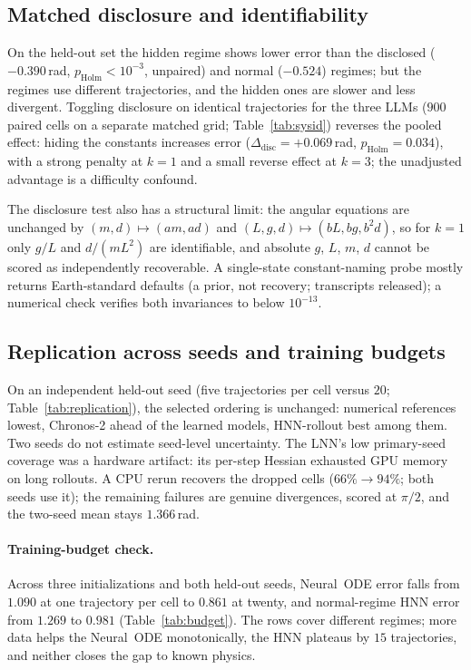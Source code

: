 \documentclass{article}
\begin{document}
\subsection{Matched disclosure and identifiability}
\label{sec:sysid}
On the held-out set the hidden regime shows lower error than the disclosed ($-0.390$\,rad,
$p_{\mathrm{Holm}}{<}10^{-3}$, unpaired) and normal ($-0.524$) regimes; but the regimes use
different trajectories, and the hidden ones are slower and less divergent. Toggling
disclosure on identical trajectories for the three LLMs ($900$ paired cells on a separate
matched grid; Table~\ref{tab:sysid}) reverses the pooled effect: hiding the constants
increases error ($\Delta_{\mathrm{disc}}{=}{+}0.069$\,rad, $p_{\mathrm{Holm}}{=}0.034$),
with a strong penalty at $k{=}1$ and a small reverse effect at $k{=}3$; the unadjusted
advantage is a difficulty
confound.

The disclosure test also has a structural limit: the angular equations are unchanged by
$(m,d)\mapsto(am,ad)$ and $(L,g,d)\mapsto(bL,bg,b^2d)$, so for $k{=}1$ only $g/L$ and
$d/(mL^2)$ are identifiable, and absolute $g$, $L$, $m$, $d$ cannot
be scored as independently recoverable. A single-state constant-naming probe mostly returns
Earth-standard defaults (a prior, not recovery; transcripts released); a numerical check verifies both invariances
to below $10^{-13}$.

\subsection{Replication across seeds and training budgets}
\label{sec:replication}
On an independent held-out seed (five trajectories per cell versus $20$;
Table~\ref{tab:replication}), the selected ordering is unchanged: numerical references
lowest, Chronos-2 ahead of the learned models, HNN-rollout best among them. Two seeds do not
estimate seed-level uncertainty. The LNN's low primary-seed coverage was a hardware
artifact: its per-step Hessian exhausted GPU memory on long rollouts. A CPU rerun recovers the
dropped cells ($66\%\to94\%$; both seeds use it); the remaining failures are genuine
divergences, scored at $\pi/2$, and the two-seed mean stays $1.366$\,rad.

\paragraph{Training-budget check.}
Across three initializations and both held-out seeds, Neural~ODE error falls from $1.090$ at
one trajectory per cell to $0.861$ at twenty, and normal-regime HNN error from $1.269$ to
$0.981$ (Table~\ref{tab:budget}). The rows cover different regimes; more data helps the
Neural~ODE monotonically, the HNN plateaus by $15$ trajectories, and neither closes the gap
to known physics.
\end{document}
